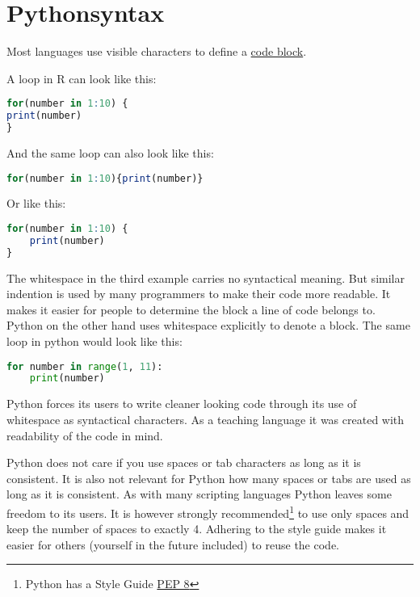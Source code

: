 \documentclass{article}
\begin{document}
\section{Pythonsyntax}

Most languages use visible characters to define a
\href{https://en.wikipedia.org/wiki/Block_(programming)}{code block}.

A loop in R can look like this:

\begin{lstlisting}[language=R]
for(number in 1:10) {
print(number)
}
\end{lstlisting}

And the same loop can also look like this:

\begin{lstlisting}[language=R]
for(number in 1:10){print(number)}
\end{lstlisting}

Or like this:

\begin{lstlisting}[language=R]
for(number in 1:10) {
    print(number)
}
\end{lstlisting}


The whitespace in the third example carries no syntactical meaning.
But similar indention is used by many programmers to make their
code more readable.
It makes it easier for people to determine the block a line of code belongs to.
Python on the other hand uses whitespace explicitly to denote a block.
The same loop in python would look like this:

\begin{lstlisting}[language=Python]
for number in range(1, 11):
    print(number)
\end{lstlisting}

Python forces its users to write cleaner looking code through its use of whitespace
as syntactical characters.
As a teaching language it was created with readability of the code in mind.

Python does not care if you use spaces or tab characters as long as it is consistent.
It is also not relevant for Python how many spaces or tabs are used as long as it is consistent.
As with many scripting languages Python leaves some freedom to its users.
It is however strongly recommended\footnote{
    Python has a Style Guide
    \href{https://www.python.org/dev/peps/pep-0008/}{PEP 8}
}
to use only spaces and keep the number of spaces to exactly 4.
Adhering to the style guide makes it easier for others (yourself in the future included)
to reuse the code.
\end{document}
